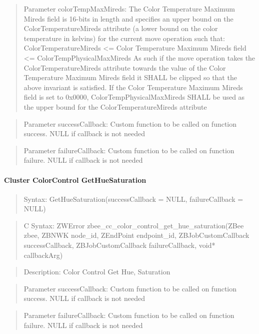 \begin{quote}Parameter colorTempMaxMireds: The Color Temperature Maximum Mireds field is 16-bits in length and specifies an upper bound on the ColorTemperatureMireds attribute (a lower bound on the color temperature in kelvins) for the current move operation such that: ColorTemperatureMireds <= Color Temperature Maximum Mireds field <= ColorTempPhysicalMaxMireds As such if the move operation takes the ColorTemperatureMireds attribute towards the value of the Color Temperature Maximum Mireds field it SHALL be clipped so that the above invariant is satisfied. If the Color Temperature Maximum Mireds field is set to 0x0000, ColorTempPhysicalMaxMireds SHALL be used as the upper bound for the ColorTemperatureMireds attribute\end{quote}
\begin{quote}Parameter successCallback: Custom function to be called on function success. NULL if callback is not needed\end{quote}
\begin{quote}Parameter failureCallback: Custom function to be called on function failure. NULL if callback is not needed\end{quote}


\paragraph{Cluster ColorControl GetHueSaturation}
\begin{quote}Syntax: GetHueSaturation(successCallback = NULL, failureCallback = NULL)\end{quote}
\begin{quote}C Syntax: ZWError zbee\_cc\_color\_control\_get\_hue\_saturation(ZBee zbee, ZBNWK node\_id, ZEndPoint endpoint\_id, ZBJobCustomCallback successCallback, ZBJobCustomCallback failureCallback, void* callbackArg)\end{quote}
\begin{quote}Description: Color Control Get Hue, Saturation\end{quote}
\begin{quote}Parameter successCallback: Custom function to be called on function success. NULL if callback is not needed\end{quote}
\begin{quote}Parameter failureCallback: Custom function to be called on function failure. NULL if callback is not needed\end{quote}


